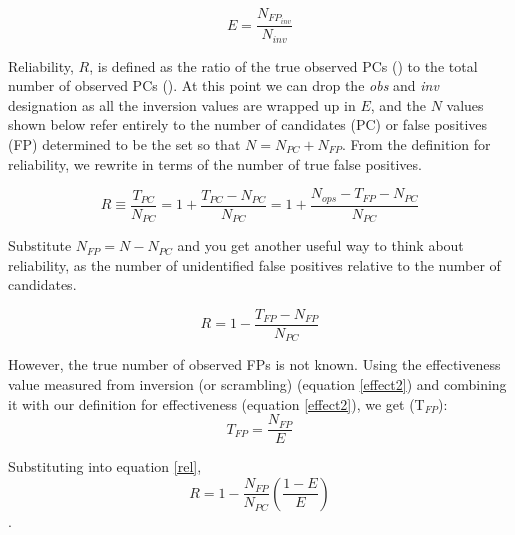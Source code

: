 \begin{equation}
\label{effect2}
E = \frac{N_{FP_{inv}}}{N_{inv}}
\end{equation}

Reliability, $R$, is defined as the ratio of the true observed PCs (\trueopspc) to the total number of observed PCs (\opspc). At this point we can drop the \textit{obs} and \textit{inv} designation as all the inversion values are wrapped up in $E$, and the $N$ values shown below refer entirely to the number of candidates (PC) or false positives (FP) determined to be the \opstce set so that $N=N_{PC} + N_{FP}$. From the definition for reliability, we rewrite in terms of the number of true false positives.

\begin{equation}
R \equiv \frac{T_{PC}}{N_{PC}} =  1 + \frac{T_{PC}-N_{PC}}{N_{PC}} 
= 1 + \frac{N_{ops} - T_{FP} - N_{PC}}{N_{PC}}
\end{equation}

Substitute $N_{FP}=N-N_{PC}$ and you get another useful way to think about reliability, as the number of unidentified false positives relative to the number of candidates.

\begin{equation}
\label{rel}
R = 1 - \frac{T_{FP}-N_{FP}}{N_{PC}}
\end{equation}

However, the true number of observed FPs is not known. Using the effectiveness value measured from inversion (or scrambling) (equation \ref{effect2}) and combining it with our definition for effectiveness (equation \ref{effect2}), we get (T$_{FP}$):
\begin{equation}
T_{FP} = \frac{N_{FP}}{E} 
\end{equation}

Substituting into equation \ref{rel},
\textbf{
\begin{equation}
R= 1 - \frac{N_{FP}}{N_{PC}}(\frac{1-E}{E})
\end{equation}
}.



